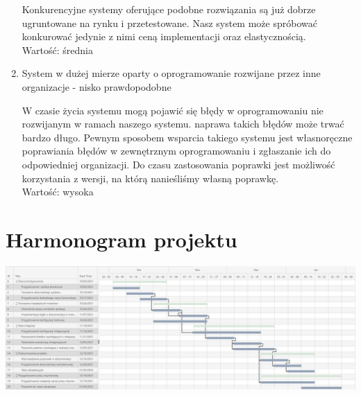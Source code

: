 \documentclass[12pt]{article}
\begin{document}
\begin{enumerate}
	      Konkurencyjne systemy oferujące podobne rozwiązania są już dobrze ugruntowane na rynku i przetestowane. Nasz system może spróbować konkurować jedynie z nimi ceną implementacji oraz elastycznością.\\
	      Wartość: średnia
	\item System w dużej mierze oparty o oprogramowanie rozwijane przez inne organizacje - nisko prawdopodobne

	      W czasie życia systemu mogą pojawić się błędy w oprogramowaniu nie rozwijanym w ramach naszego systemu. naprawa takich błędów może trwać bardzo długo. Pewnym sposobem wsparcia takiego systemu jest własnoręczne poprawiania błędów w zewnętrznym oprogramowaniu i zgłaszanie ich do odpowiedniej organizacji. Do czasu zastosowania poprawki jest możliwość korzystania z wersji, na którą nanieśliśmy własną poprawkę.\\
	      Wartość: wysoka

\end{enumerate}


\section{Harmonogram projektu}
\includegraphics[width=\textwidth]{resources/harmonogram.png}
\end{document}
